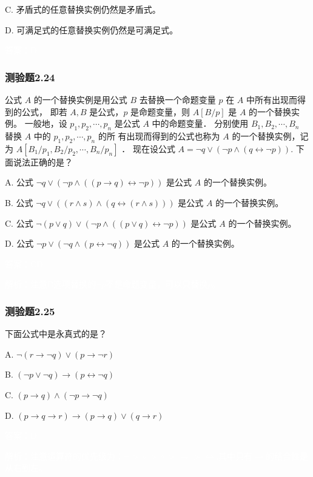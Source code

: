 \documentclass[UTF8, heading=true]{ctexart}
\begin{document}
C. 矛盾式的任意替换实例仍然是矛盾式。

D. 可满足式的任意替换实例仍然是可满足式。

\textcolor{white}{答案：D}

\subsubsection{测验题2.24}

公式 $A$ 的一个替换实例是用公式 $B$ 去替换一个命题变量 $p$ 在 $A$ 中所有出现而得到的公式，
即若 $A, B$ 是公式，$p$ 是命题变量，则 $A[B / p]$ 是 $A$ 的一个替换实例。
一般地，设 $p_1, p_2, \cdots, p_n$ 是公式 $A$ 中的命题变量．
分别使用 $B_1, B_2, \cdots, B_n$ 替换 $A$ 中的 $p_1, p_2, \cdots, p_n$ 的所
有出现而得到的公式也称为 $A$ 的一个替换实例，记为 $A\left[B_1 / p_1, B_2 / p_2, \cdots, B_n / p_n\right]$ ．
现在设公式 $A=\neg q \vee(\neg p \wedge(q \leftrightarrow \neg p))$.
 下面说法正确的是？

A. 
公式 $\neg q \vee(\neg p \wedge((p \rightarrow q) \leftrightarrow \neg p))$ 是公式 $A$ 的一个替换实例。

B. 
公式 $\neg q \vee((r \wedge s) \wedge(q \leftrightarrow(r \wedge s)))$ 是公式 $A$ 的一个替换实例。

C. 
公式 $\neg(p \vee q) \vee(\neg p \wedge((p \vee q) \leftrightarrow \neg p))$ 是公式 $A$ 的一个替换实例。

D.  
公式 $\neg p \vee(\neg q \wedge(p \leftrightarrow \neg q))$ 是公式 $A$ 的一个替换实例。


\textcolor{white}{答案：CD}

\textcolor{white}{解析：注意B选项替换的$\neg p$不是命题变量，可以只替换$p$。}

\subsubsection{测验题2.25}

下面公式中是永真式的是？

A. $ \neg(r \rightarrow \neg q) \vee(p \rightarrow \neg r)$

B. $(\neg p \vee \neg q) \rightarrow(p \leftrightarrow \neg q)$

C. $(p \rightarrow q) \wedge(\neg p \rightarrow \neg q)$

D. $(p \rightarrow q \rightarrow r) \rightarrow(p \rightarrow q) \vee(q \rightarrow r)$

\textcolor{white}{答案：D}

\textcolor{white}{解析：注意运算符的优先级为：$\neg$ >  $\vee$ > $\wedge$ > $\rightarrow$ > $\leftrightarrow$,其中只有$\rightarrow$的结合性是从右到左。}
\end{document}
